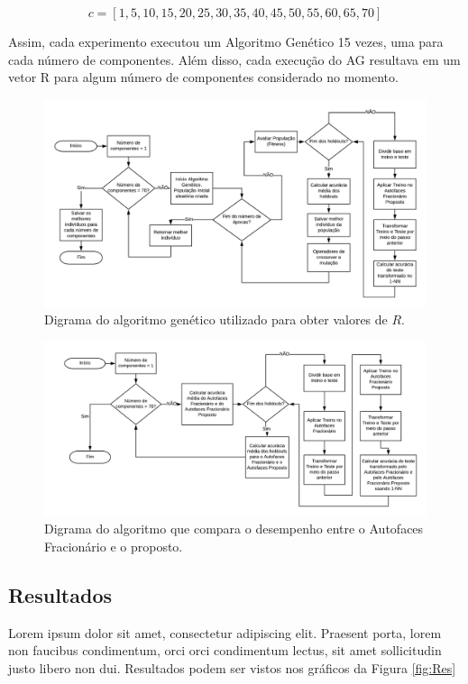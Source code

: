 \documentclass[12pt]{article}
\begin{document}
$$c = [1, 5, 10, 15, 20, 25, 30, 35, 40, 45, 50, 55, 60, 65, 70]$$

Assim, cada experimento executou um Algoritmo Genético 15 vezes, uma para cada número de componentes. Além disso, cada execução do AG resultava em um vetor R para algum número de componentes considerado no momento.

\begin{figure}[!h] \centering
\includegraphics[scale=0.7]{diagrama1.png}
\caption{Digrama do algoritmo genético utilizado para obter valores de $R$.}
\label{fig:diagrama1}
\end{figure}

\begin{figure}[!h] \centering
\includegraphics[scale=0.7]{diagrama2.png}
\caption{Digrama do algoritmo que compara o desempenho entre o Autofaces Fracionário e o proposto.}
\label{fig:diagrama2}
\end{figure}

\subsection{Resultados}

Lorem ipsum dolor sit amet, consectetur adipiscing elit. Praesent porta, lorem non faucibus condimentum, orci orci condimentum lectus, sit amet sollicitudin justo libero non dui. Resultados podem ser vistos nos gráficos da Figura \ref{fig:Res}
\end{document}

